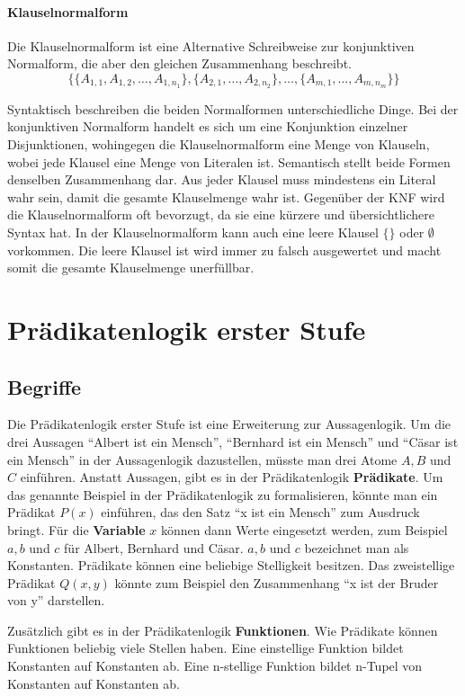 \paragraph{Klauselnormalform}
Die Klauselnormalform ist eine Alternative Schreibweise zur konjunktiven Normalform, die aber den gleichen Zusammenhang beschreibt.
$$\{\{A_{1,1},A_{1,2},\ldots,A_{1,n_1}\},
\{A_{2,1},\ldots,A_{2,n_2}\},\ldots,
\{A_{m,1},\ldots,A_{m,n_m}\}\}$$

Syntaktisch beschreiben die beiden Normalformen unterschiedliche Dinge. Bei der konjunktiven Normalform handelt es sich um eine Konjunktion einzelner Disjunktionen, wohingegen die Klauselnormalform eine Menge von Klauseln, wobei jede Klausel eine Menge von Literalen ist.
Semantisch stellt beide Formen denselben Zusammenhang dar. Aus jeder Klausel muss mindestens ein Literal wahr sein, damit die gesamte Klauselmenge wahr ist.
Gegenüber der KNF wird die Klauselnormalform oft bevorzugt, da sie eine kürzere und übersichtlichere Syntax hat. In der Klauselnormalform kann auch eine leere Klausel $\{\}$ oder $\emptyset$ vorkommen. Die leere Klausel ist wird immer zu falsch ausgewertet und macht somit die gesamte Klauselmenge unerfüllbar.

	\section{Prädikatenlogik erster Stufe}
		\subsection{Begriffe}

Die Prädikatenlogik erster Stufe ist eine Erweiterung zur Aussagenlogik. Um die drei Aussagen "`Albert ist ein Mensch"', "`Bernhard ist ein Mensch"' und "`Cäsar ist ein Mensch"' in der Aussagenlogik dazustellen, müsste man drei Atome $A, B$ und $C$ einführen. Anstatt Aussagen, gibt es in der Prädikatenlogik \textbf{Prädikate}. Um das genannte Beispiel in der Prädikatenlogik zu formalisieren, könnte man ein Prädikat $P(x)$ einführen, das den Satz "`x ist ein Mensch"' zum Ausdruck bringt. Für die \textbf{Variable} $x$ können dann Werte eingesetzt werden, zum Beispiel $a, b$ und $c$ für Albert, Bernhard und Cäsar. $a, b$ und $c$ bezeichnet man als Konstanten.
Prädikate können eine beliebige Stelligkeit besitzen. Das zweistellige Prädikat $Q(x,y)$ könnte zum Beispiel den Zusammenhang "`x ist der Bruder von y"' darstellen.

Zusätzlich gibt es in der Prädikatenlogik \textbf{Funktionen}. Wie Prädikate können Funktionen beliebig viele Stellen haben. Eine einstellige Funktion bildet Konstanten auf Konstanten ab. Eine n-stellige Funktion bildet n-Tupel von Konstanten auf Konstanten ab.

